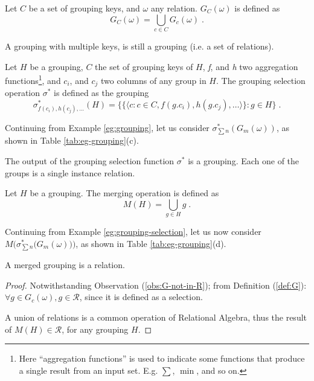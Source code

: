 \begin{definition}\label{def:G-keys}
Let $C$ be a set of grouping keys, and $\omega$ any relation.
$G_C(\omega)$ is defined as
$$
G_C(\omega) = \bigcup_{c \in C}G_c(\omega) \; .
$$
\end{definition}

\begin{observation}
A grouping with multiple keys, is still a grouping (i.e. a set of relations).
\end{observation}

\begin{definition}\label{def:sigma*}
Let $H$ be a grouping, $C$ the set of grouping keys of $H$, \emph{f}, and \emph{h} two aggregation functions\footnote{%
Here ``aggregation functions'' is used to indicate some functions that produce a single result from an input set. E.g. $\sum$, $\min$, and so on.
}, and $c_i$, and $c_j$ two columns of any group in $H$.
The grouping selection operation $\sigma^*$ is defined as the grouping
$$
\sigma^*_{f(c_i), h(c_j), \dots}(H) = \Big\{
    \big\{ \langle c : c \in C, f(g.c_i), h(g.c_j), \dots \rangle \big\} : g \in H
\Big\} \; .
$$
\end{definition}

\begin{example}\label{eg:grouping-selection}
Continuing from Example \ref{eg:grouping}, let us consider $\sigma^*_{\sum{n}}(G_m(\omega))$, as shown in Table \ref{tab:eg-grouping}(c).
\end{example}

\begin{observation}
The output of the grouping selection function $\sigma^*$ is a grouping.
Each one of the groups is a single instance relation.
\end{observation}

\begin{definition}
Let $H$ be a grouping. The merging operation is defined as
$$
M(H) = \bigcup_{g \in H} g \; .
$$
\end{definition}

\begin{example}\label{eg:grouping-merge}
Continuing from Example \ref{eg:grouping-selection}, let us now consider $M\Big(\sigma^*_{\sum{n}}\big(G_m(\omega)\big)\Big)$, as shown in Table \ref{tab:eg-grouping}(d).
\end{example}

\begin{proposition}
A merged grouping is a relation.
\end{proposition}
\begin{proof}
Notwithstanding Observation (\ref{obs:G-not-in-R}); from Definition (\ref{def:G}): $\forall g \in G_c(\omega), g \in \mathcal{R}$, since it is defined as a selection.

A union of relations is a common operation of Relational Algebra, thus the result of $M(H) \in \mathcal{R}$, for any grouping $H$. 
\end{proof}

